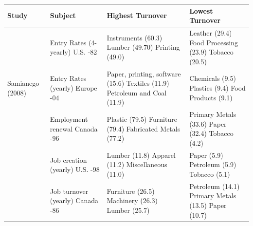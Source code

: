 \begin{center}
\begin{table}
\begin{tabular}{|p{2.8cm}|p{4cm}|p{4cm}|p{4cm}|}
\hline
\textbf{Study}  &  \textbf{Subject}  &  \textbf{Highest Turnover}  & \textbf{Lowest Turnover} \\
\hline 
\hline
\citet{Dunne1988} & Entry Rates (4-yearly) \newline U.S. \newline 63-82    & Instruments (60.3) \newline Lumber (49.70) \newline Printing (49.0)  & Leather (29.4) \newline  Food Processing (23.9) \newline Tobacco (20.5) \\  
\hline
Samianego (2008)   & Entry Rates (yearly)  \newline Europe \newline 97-04  & Paper, printing, software (15.6) \newline Textiles (11.9) \newline Petroleum and Coal (11.9) & Chemicals (9.5) \newline Plastics (9.4) \newline Food Products (9.1) \\
\hline 
\citet{Brown2004}  & Employment renewal    \newline Canada \newline 73-96  & Plastic (79.5) \newline Furniture (79.4) \newline Fabricated Metals (77.2) & Primary Metals (33.6) \newline Paper (32.4) \newline Tobacco (4.2) \\
\hline
\citet{Foster2006} & Job creation (yearly) \newline U.S. \newline 72-98     & Lumber (11.8) \newline Apparel (11.2) \newline Miscellaneous (11.0) & Paper (5.9) \newline Petroleum (5.9) \newline Tobacco (5.1) \\
\hline
\citet{Baldwin1994} & Job turnover (yearly) \newline Canada \newline 73-86 & Furniture (26.5) \newline Machinery (26.3) \newline Lumber (25.7) & Petroleum (14.1) \newline Primary Metals (13.5) \newline Paper (10.7)  \\

\end{tabular}
\end{table}
\end{center}
